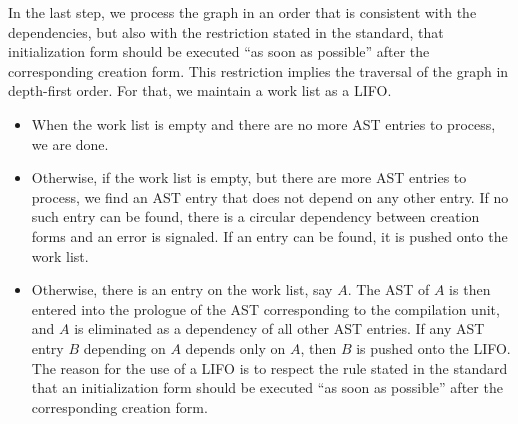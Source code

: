 In the last step, we process the graph in an order that is consistent
with the dependencies, but also with the restriction stated in the
\commonlisp{} standard, that initialization form should be executed
``as soon as possible'' after the corresponding creation form.  This
restriction implies the traversal of the graph in depth-first order.
For that, we maintain a work list as a LIFO.

\begin{itemize}
\item When the work list is empty and there are no more AST entries to
  process, we are done.
\item Otherwise, if the work list is empty, but there are more AST
  entries to process, we find an AST entry that does not depend on any
  other entry.  If no such entry can be found, there is a circular
  dependency between creation forms and an error is signaled.  If an
  entry can be found, it is pushed onto the work list.
\item Otherwise, there is an entry on the work list, say $A$.  The AST
  of $A$ is then entered into the prologue of the AST corresponding to
  the compilation unit, and $A$ is eliminated as a dependency of all
  other AST entries. If any AST entry $B$ depending on $A$ depends
  only on $A$, then $B$ is pushed onto the LIFO.  The reason for the
  use of a LIFO is to respect the rule stated in the standard that an
  initialization form should be executed ``as soon as possible'' after
  the corresponding creation form.
\end{itemize}
